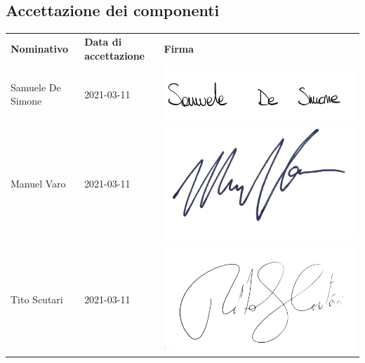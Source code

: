     \subsection{Accettazione dei componenti}
        \begin{center}
            \begin{table}[h!]
                \centering
                \renewcommand{\arraystretch}{1.8}
                \begin{tabular}{p{150px} p{110px} p{110px}}
                    \rowcolor{logo!70} \textbf{Nominativo} & \textbf{Data di accettazione} & \textbf{Firma}\\
                    Samuele De Simone & 2021-03-11 & \includegraphics[scale=0.06]{../../../Images/firme/firmaSamueleDeSimone.png} \\
                    Manuel Varo & 2021-03-11 & \includegraphics[scale=0.04]{../../../Images/firme/firmaManuelVaro.png} \\
                    Tito Scutari & 2021-03-11 & \includegraphics[scale=0.04]{../../../Images/firme/firmaTitoScutari.png} \\

\end{tabular}
\end{table}
\end{center}
